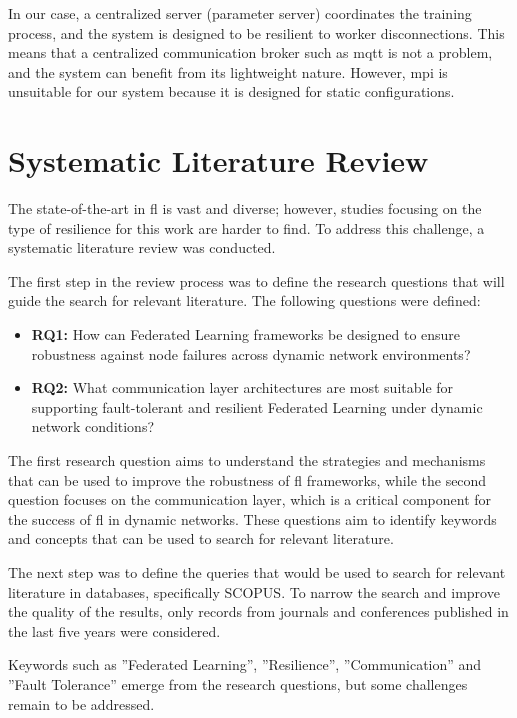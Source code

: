 In our case, a centralized server (parameter server) coordinates the training process, and the system is designed to be resilient to worker disconnections. This means that a centralized communication broker such as \ac{mqtt} is not a problem, and the system can benefit from its lightweight nature. However, \ac{mpi} is unsuitable for our system because it is designed for static configurations.



\section{Systematic Literature Review}
\label{sec:slr}

The state-of-the-art in \ac{fl} is vast and diverse; however, studies focusing on the type of resilience for this work are harder to find. To address this challenge, a systematic literature review was conducted.

The first step in the review process was to define the research questions that will guide the search for relevant literature. The following questions were defined:

\begin{itemize}
    \item \textbf{RQ1:} How can Federated Learning frameworks be designed to ensure robustness against node failures across dynamic network environments?
    \item \textbf{RQ2:} What communication layer architectures are most suitable for supporting fault-tolerant and resilient Federated Learning under dynamic network conditions?
\end{itemize}

The first research question aims to understand the strategies and mechanisms that can be used to improve the robustness of \ac{fl} frameworks, while the second question focuses on the communication layer, which is a critical component for the success of \ac{fl} in dynamic networks. These questions aim to identify keywords and concepts that can be used to search for relevant literature.

The next step was to define the queries that would be used to search for relevant literature in databases, specifically SCOPUS. To narrow the search and improve the quality of the results, only records from journals and conferences published in the last five years were considered.

Keywords such as ''Federated Learning'', ''Resilience'', ''Communication'' and ''Fault Tolerance'' emerge from the research questions, but some challenges remain to be addressed. 

